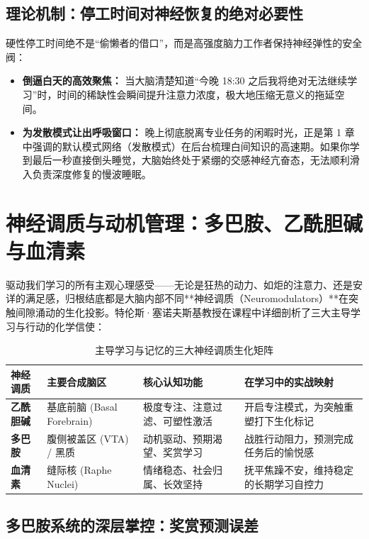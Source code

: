 \documentclass[12pt,a4paper,openany]{ctexbook}
\begin{document}
\subsection*{理论机制：停工时间对神经恢复的绝对必要性}

硬性停工时间绝不是“偷懒者的借口”，而是高强度脑力工作者保持神经弹性的安全阀：
\begin{itemize}
    \item \textbf{倒逼白天的高效聚焦：} 当大脑清楚知道“今晚 18:30 之后我将绝对无法继续学习”时，时间的稀缺性会瞬间提升注意力浓度，极大地压缩无意义的拖延空间。
    \item \textbf{为发散模式让出呼吸窗口：} 晚上彻底脱离专业任务的闲暇时光，正是第 1 章中强调的默认模式网络（发散模式）在后台梳理白间知识的高速期。如果你学到最后一秒直接倒头睡觉，大脑始终处于紧绷的交感神经亢奋态，无法顺利滑入负责深度修复的慢波睡眠。
\end{itemize}

\section{神经调质与动机管理：多巴胺、乙酰胆碱与血清素}

驱动我们学习的所有主观心理感受——无论是狂热的动力、如炬的注意力、还是安详的满足感，归根结底都是大脑内部不同**神经调质（Neuromodulators）**在突触间隙涌动的生化投影。特伦斯·塞诺夫斯基教授在课程中详细剖析了三大主导学习与行动的化学信使：

\begin{table}[H]
\centering
\small
\begin{tabular}{@{}llll@{}}
\toprule
\textbf{神经调质} & \textbf{主要合成脑区} & \textbf{核心认知功能} & \textbf{在学习中的实战映射} \\ \midrule
\textbf{乙酰胆碱} & 基底前脑 (Basal Forebrain) & 极度专注、注意过滤、可塑性激活 & 开启专注模式，为突触重塑打下生化标记 \\
\textbf{多巴胺} & 腹侧被盖区 (VTA) / 黑质 & 动机驱动、预期渴望、奖赏学习 & 战胜行动阻力，预测完成任务后的愉悦感 \\
\textbf{血清素} & 缝际核 (Raphe Nuclei) & 情绪稳态、社会归属、长效坚持 & 抚平焦躁不安，维持稳定的长期学习自控力 \\ \bottomrule
\end{tabular}
\caption{主导学习与记忆的三大神经调质生化矩阵}
\end{table}

\subsection*{多巴胺系统的深层掌控：奖赏预测误差}
\end{document}
